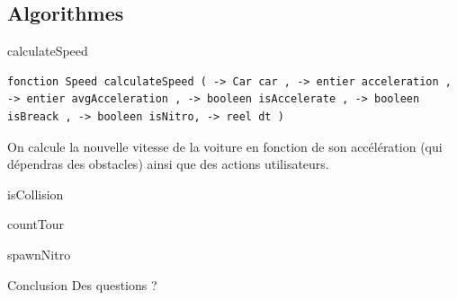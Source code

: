 \documentclass[10pt,dvipsnames,final]{beamer}
\begin{document}
\subsection{Algorithmes}

\begin{frame}[fragile]{calculateSpeed}
\begin{lstlisting}[language=pdl]
fonction Speed calculateSpeed ( -> Car car , -> entier acceleration , -> entier avgAcceleration , -> booleen isAccelerate , -> booleen isBreack , -> booleen isNitro, -> reel dt )
\end{lstlisting}

On calcule la nouvelle vitesse de la voiture en fonction de son accélération (qui dépendras des obstacles) ainsi que des actions utilisateurs.
\end{frame}

\begin{frame}{isCollision}

\end{frame}

\begin{frame}{countTour}

\end{frame}

\begin{frame}{spawnNitro}

\end{frame}

\begin{frame}{Conclusion}
\Huge\centering
Des questions ?
\end{frame}
\end{document}

